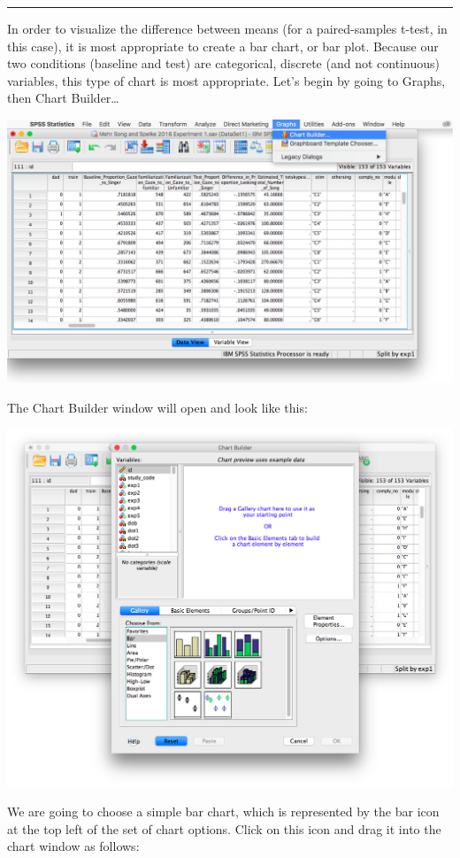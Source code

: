 \documentclass[
]{book}
\begin{document}
\begin{center}\rule{0.5\linewidth}{0.5pt}\end{center}

In order to visualize the difference between means (for a paired-samples t-test, in this case), it is most appropriate to create a bar chart, or bar plot. Because our two conditions (baseline and test) are categorical, discrete (and not continuous) variables, this type of chart is most appropriate. Let's begin by going to {Graphs}, then {Chart Builder\ldots{}}

\includegraphics{img/6.4.20.png}

The Chart Builder window will open and look like this:

\includegraphics{img/6.4.21.png}

We are going to choose a simple bar chart, which is represented by the bar icon at the top left of the set of chart options. Click on this icon and drag it into the chart window as follows:
\end{document}
